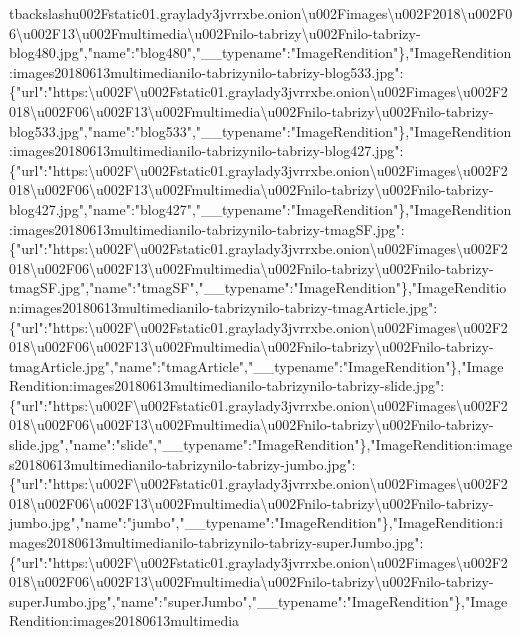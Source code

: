 tbackslash{}u002Fstatic01.graylady3jvrrxbe.onion\textbackslash{}u002Fimages\textbackslash{}u002F2018\textbackslash{}u002F06\textbackslash{}u002F13\textbackslash{}u002Fmultimedia\textbackslash{}u002Fnilo-tabrizy\textbackslash{}u002Fnilo-tabrizy-blog480.jpg","name":"blog480","\_\_typename":"ImageRendition"\},"ImageRendition:images20180613multimedianilo-tabrizynilo-tabrizy-blog533.jpg":\{"url":"https:\textbackslash{}u002F\textbackslash{}u002Fstatic01.graylady3jvrrxbe.onion\textbackslash{}u002Fimages\textbackslash{}u002F2018\textbackslash{}u002F06\textbackslash{}u002F13\textbackslash{}u002Fmultimedia\textbackslash{}u002Fnilo-tabrizy\textbackslash{}u002Fnilo-tabrizy-blog533.jpg","name":"blog533","\_\_typename":"ImageRendition"\},"ImageRendition:images20180613multimedianilo-tabrizynilo-tabrizy-blog427.jpg":\{"url":"https:\textbackslash{}u002F\textbackslash{}u002Fstatic01.graylady3jvrrxbe.onion\textbackslash{}u002Fimages\textbackslash{}u002F2018\textbackslash{}u002F06\textbackslash{}u002F13\textbackslash{}u002Fmultimedia\textbackslash{}u002Fnilo-tabrizy\textbackslash{}u002Fnilo-tabrizy-blog427.jpg","name":"blog427","\_\_typename":"ImageRendition"\},"ImageRendition:images20180613multimedianilo-tabrizynilo-tabrizy-tmagSF.jpg":\{"url":"https:\textbackslash{}u002F\textbackslash{}u002Fstatic01.graylady3jvrrxbe.onion\textbackslash{}u002Fimages\textbackslash{}u002F2018\textbackslash{}u002F06\textbackslash{}u002F13\textbackslash{}u002Fmultimedia\textbackslash{}u002Fnilo-tabrizy\textbackslash{}u002Fnilo-tabrizy-tmagSF.jpg","name":"tmagSF","\_\_typename":"ImageRendition"\},"ImageRendition:images20180613multimedianilo-tabrizynilo-tabrizy-tmagArticle.jpg":\{"url":"https:\textbackslash{}u002F\textbackslash{}u002Fstatic01.graylady3jvrrxbe.onion\textbackslash{}u002Fimages\textbackslash{}u002F2018\textbackslash{}u002F06\textbackslash{}u002F13\textbackslash{}u002Fmultimedia\textbackslash{}u002Fnilo-tabrizy\textbackslash{}u002Fnilo-tabrizy-tmagArticle.jpg","name":"tmagArticle","\_\_typename":"ImageRendition"\},"ImageRendition:images20180613multimedianilo-tabrizynilo-tabrizy-slide.jpg":\{"url":"https:\textbackslash{}u002F\textbackslash{}u002Fstatic01.graylady3jvrrxbe.onion\textbackslash{}u002Fimages\textbackslash{}u002F2018\textbackslash{}u002F06\textbackslash{}u002F13\textbackslash{}u002Fmultimedia\textbackslash{}u002Fnilo-tabrizy\textbackslash{}u002Fnilo-tabrizy-slide.jpg","name":"slide","\_\_typename":"ImageRendition"\},"ImageRendition:images20180613multimedianilo-tabrizynilo-tabrizy-jumbo.jpg":\{"url":"https:\textbackslash{}u002F\textbackslash{}u002Fstatic01.graylady3jvrrxbe.onion\textbackslash{}u002Fimages\textbackslash{}u002F2018\textbackslash{}u002F06\textbackslash{}u002F13\textbackslash{}u002Fmultimedia\textbackslash{}u002Fnilo-tabrizy\textbackslash{}u002Fnilo-tabrizy-jumbo.jpg","name":"jumbo","\_\_typename":"ImageRendition"\},"ImageRendition:images20180613multimedianilo-tabrizynilo-tabrizy-superJumbo.jpg":\{"url":"https:\textbackslash{}u002F\textbackslash{}u002Fstatic01.graylady3jvrrxbe.onion\textbackslash{}u002Fimages\textbackslash{}u002F2018\textbackslash{}u002F06\textbackslash{}u002F13\textbackslash{}u002Fmultimedia\textbackslash{}u002Fnilo-tabrizy\textbackslash{}u002Fnilo-tabrizy-superJumbo.jpg","name":"superJumbo","\_\_typename":"ImageRendition"\},"ImageRendition:images20180613multimedia
